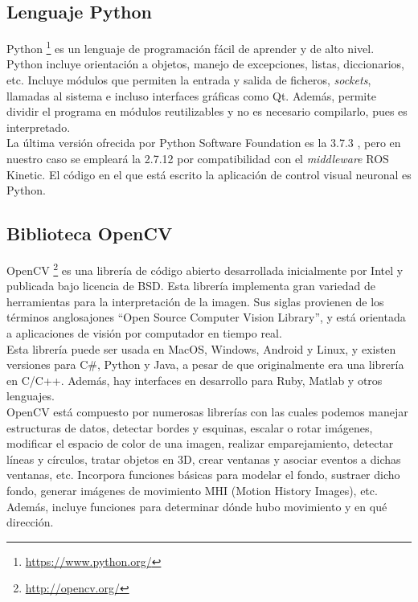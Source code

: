 \subsection{Lenguaje Python}

Python \footnote{\url{https://www.python.org/}} es un lenguaje de programación fácil de aprender y de alto nivel. Python incluye orientación a objetos, manejo de excepciones, listas, diccionarios, etc. Incluye módulos que permiten la entrada y salida de ficheros, \textit{sockets}, llamadas al sistema e incluso interfaces gráficas como Qt. Además, permite dividir el programa en módulos reutilizables y no es necesario compilarlo, pues es interpretado.\\

La última versión ofrecida por Python Software Foundation es la 3.7.3 , pero en nuestro caso se empleará la 2.7.12 por compatibilidad con  el \textit{middleware} ROS Kinetic. El código en el que está escrito la aplicación de control visual neuronal es Python.


\subsection{Biblioteca OpenCV}

OpenCV \footnote{\url{http://opencv.org/}} es una librería de código abierto desarrollada inicialmente por Intel y publicada bajo licencia de BSD. Esta librería implementa gran variedad de herramientas para la interpretación de la imagen. Sus siglas provienen de los términos anglosajones ``Open Source Computer Vision Library'', y está orientada a aplicaciones de visión por computador en tiempo real. \\

Esta librería puede ser usada en MacOS, Windows, Android y Linux, y existen versiones para C\#, Python y Java, a pesar de que originalmente era una librería en C/C++. Además, hay interfaces en desarrollo para Ruby, Matlab y otros lenguajes.\\

OpenCV está compuesto por numerosas librerías con las cuales podemos manejar estructuras de datos, detectar bordes y esquinas, escalar o rotar imágenes, modificar el espacio de color de una imagen, realizar emparejamiento, detectar líneas y círculos, tratar objetos en 3D, crear ventanas y asociar eventos a dichas ventanas, etc. Incorpora funciones básicas para modelar el fondo, sustraer dicho fondo, generar imágenes de movimiento MHI (Motion History Images), etc. Además, incluye funciones para determinar dónde hubo movimiento y en qué dirección. \\

